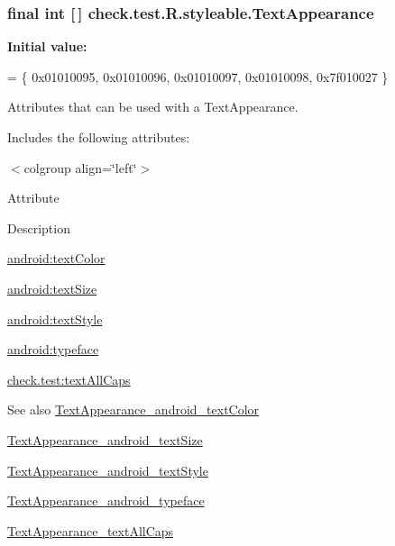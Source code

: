 \subsubsection[{Text\+Appearance}]{\setlength{\rightskip}{0pt plus 5cm}final int \mbox{[}$\,$\mbox{]} check.\+test.\+R.\+styleable.\+Text\+Appearance\hspace{0.3cm}{\ttfamily [static]}}\label{classcheck_1_1test_1_1_r_1_1styleable_a7fad54db5b363c4751d9f6f6ead61bc9}
{\bfseries Initial value\+:}
\begin{DoxyCode}
= \{
            0x01010095, 0x01010096, 0x01010097, 0x01010098,
            0x7f010027
        \}
\end{DoxyCode}
Attributes that can be used with a Text\+Appearance. 

Includes the following attributes\+:

\begin{TabularC}{0}
\hline
\end{TabularC}
$<$colgroup align=\char`\"{}left\char`\"{}$>$ 

Attribute

Description 

{\ttfamily \hyperlink{classcheck_1_1test_1_1_r_1_1styleable_a25beaa4ed9513b44df22fb79b076e5e8}{android\+:text\+Color}}

{\ttfamily \hyperlink{classcheck_1_1test_1_1_r_1_1styleable_a302a2412b9bd0616ccff3d22bd450d19}{android\+:text\+Size}}

{\ttfamily \hyperlink{classcheck_1_1test_1_1_r_1_1styleable_a322f409bd5e2d20b43b0f42b53151ebf}{android\+:text\+Style}}

{\ttfamily \hyperlink{classcheck_1_1test_1_1_r_1_1styleable_a084a3e7bc2b4a8412125c1fcc233b116}{android\+:typeface}}

{\ttfamily \hyperlink{classcheck_1_1test_1_1_r_1_1styleable_a5d5337464a97b9d29c16fc4176a319e7}{check.\+test\+:text\+All\+Caps}}

\begin{DoxySeeAlso}{See also}
\hyperlink{classcheck_1_1test_1_1_r_1_1styleable_a25beaa4ed9513b44df22fb79b076e5e8}{Text\+Appearance\+\_\+android\+\_\+text\+Color} 

\hyperlink{classcheck_1_1test_1_1_r_1_1styleable_a302a2412b9bd0616ccff3d22bd450d19}{Text\+Appearance\+\_\+android\+\_\+text\+Size} 

\hyperlink{classcheck_1_1test_1_1_r_1_1styleable_a322f409bd5e2d20b43b0f42b53151ebf}{Text\+Appearance\+\_\+android\+\_\+text\+Style} 

\hyperlink{classcheck_1_1test_1_1_r_1_1styleable_a084a3e7bc2b4a8412125c1fcc233b116}{Text\+Appearance\+\_\+android\+\_\+typeface} 

\hyperlink{classcheck_1_1test_1_1_r_1_1styleable_a5d5337464a97b9d29c16fc4176a319e7}{Text\+Appearance\+\_\+text\+All\+Caps} 
\end{DoxySeeAlso}
\hypertarget{classcheck_1_1test_1_1_r_1_1styleable_a25beaa4ed9513b44df22fb79b076e5e8}{}
